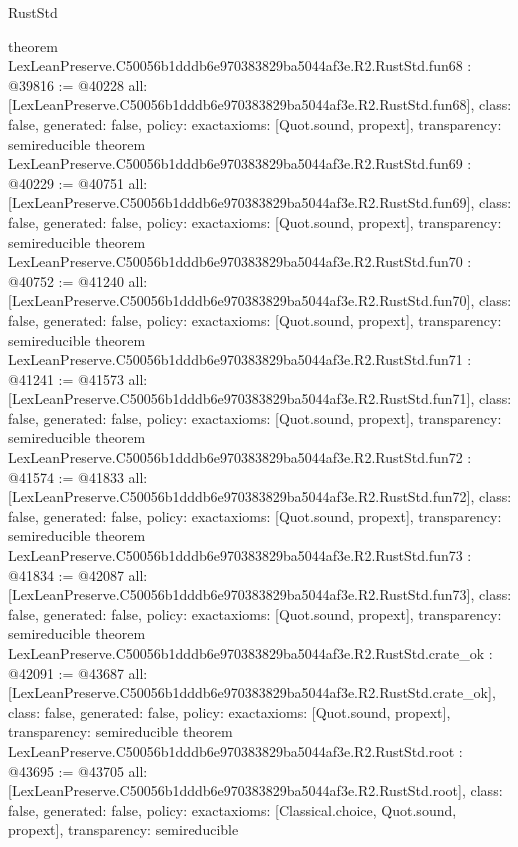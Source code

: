 \begin{lexlean}{RustStd}
\begin{coremodule}
{}
theorem LexLeanPreserve.C50056b1dddb6e970383829ba5044af3e.R2.RustStd.fun68 : @39816 := @40228 {
  all: [LexLeanPreserve.C50056b1dddb6e970383829ba5044af3e.R2.RustStd.fun68],
  class: false,
  generated: false,
  policy: exact{axioms: [Quot.sound, propext]},
  transparency: semireducible
}
theorem LexLeanPreserve.C50056b1dddb6e970383829ba5044af3e.R2.RustStd.fun69 : @40229 := @40751 {
  all: [LexLeanPreserve.C50056b1dddb6e970383829ba5044af3e.R2.RustStd.fun69],
  class: false,
  generated: false,
  policy: exact{axioms: [Quot.sound, propext]},
  transparency: semireducible
}
theorem LexLeanPreserve.C50056b1dddb6e970383829ba5044af3e.R2.RustStd.fun70 : @40752 := @41240 {
  all: [LexLeanPreserve.C50056b1dddb6e970383829ba5044af3e.R2.RustStd.fun70],
  class: false,
  generated: false,
  policy: exact{axioms: [Quot.sound, propext]},
  transparency: semireducible
}
theorem LexLeanPreserve.C50056b1dddb6e970383829ba5044af3e.R2.RustStd.fun71 : @41241 := @41573 {
  all: [LexLeanPreserve.C50056b1dddb6e970383829ba5044af3e.R2.RustStd.fun71],
  class: false,
  generated: false,
  policy: exact{axioms: [Quot.sound, propext]},
  transparency: semireducible
}
theorem LexLeanPreserve.C50056b1dddb6e970383829ba5044af3e.R2.RustStd.fun72 : @41574 := @41833 {
  all: [LexLeanPreserve.C50056b1dddb6e970383829ba5044af3e.R2.RustStd.fun72],
  class: false,
  generated: false,
  policy: exact{axioms: [Quot.sound, propext]},
  transparency: semireducible
}
theorem LexLeanPreserve.C50056b1dddb6e970383829ba5044af3e.R2.RustStd.fun73 : @41834 := @42087 {
  all: [LexLeanPreserve.C50056b1dddb6e970383829ba5044af3e.R2.RustStd.fun73],
  class: false,
  generated: false,
  policy: exact{axioms: [Quot.sound, propext]},
  transparency: semireducible
}
theorem LexLeanPreserve.C50056b1dddb6e970383829ba5044af3e.R2.RustStd.crate_ok : @42091 := @43687 {
  all: [LexLeanPreserve.C50056b1dddb6e970383829ba5044af3e.R2.RustStd.crate_ok],
  class: false,
  generated: false,
  policy: exact{axioms: [Quot.sound, propext]},
  transparency: semireducible
}
theorem LexLeanPreserve.C50056b1dddb6e970383829ba5044af3e.R2.RustStd.root : @43695 := @43705 {
  all: [LexLeanPreserve.C50056b1dddb6e970383829ba5044af3e.R2.RustStd.root],
  class: false,
  generated: false,
  policy: exact{axioms: [Classical.choice, Quot.sound, propext]},
  transparency: semireducible
}


\end{coremodule}
\end{lexlean}
